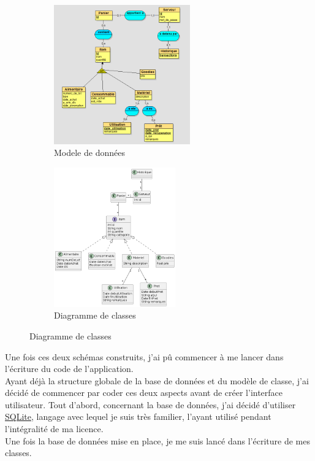 \documentclass[11pt, twoside]{article}
\begin{document}
\begin{figure}[ht]

    \begin{subfigure}{0.5\textwidth}
    \includegraphics[width=0.9\linewidth, height=6cm]{modele.png} 
    \caption{Modele de données}
    \label{fig:subim1}
    \end{subfigure}
    \begin{subfigure}{0.5\textwidth}
    \includegraphics[width=0.9\linewidth, height=6cm]{UML.png}
    \caption{Diagramme de classes}
    \label{fig:subim2}
    \end{subfigure}
    
    \label{fig:image2}
\end{figure}
Une fois ces deux schémas construits, j'ai pû commencer à me lancer dans l'écriture du code de l'application.
\vspace*{0.2cm}\\
Ayant déjà la structure globale de la base de données et du modèle de classe, j'ai décidé de commencer par coder ces deux aspects avant de créer l'interface utilisateur.
Tout d'abord, concernant la base de données, j'ai décidé d'utiliser \underline{SQLite}\cite{Sql}, langage avec lequel je suis très familier, l'ayant utilisé pendant l'intégralité de ma licence.
\vspace*{0.2cm}\\
Une fois la base de données mise en place, je me suis lancé dans l'écriture de mes classes. 
\end{document}
